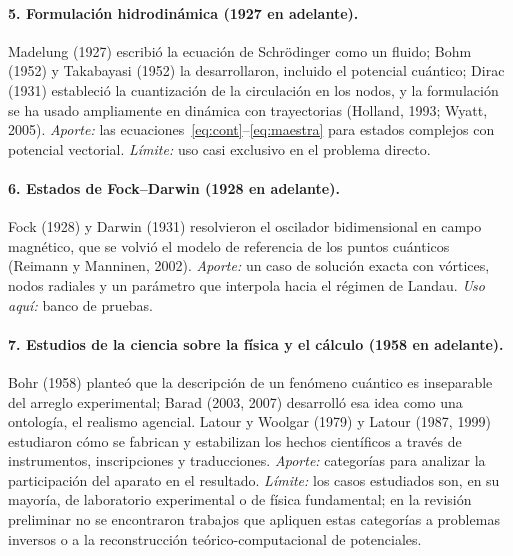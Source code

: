 \documentclass[12pt,letterpaper]{article}
\begin{document}
\paragraph{5. Formulación hidrodinámica (1927 en adelante).} Madelung (1927) escribió la ecuación de Schrödinger como un
fluido; Bohm (1952) y Takabayasi (1952) la desarrollaron, incluido el potencial cuántico; Dirac (1931) estableció la
cuantización de la circulación en los nodos, y la formulación se ha usado ampliamente en dinámica con trayectorias
(Holland, 1993; Wyatt, 2005). \emph{Aporte:} las ecuaciones~\eqref{eq:cont}--\eqref{eq:maestra} para estados complejos
con potencial vectorial. \emph{Límite:} uso casi exclusivo en el problema directo.

\paragraph{6. Estados de Fock--Darwin (1928 en adelante).} Fock (1928) y Darwin (1931) resolvieron el oscilador
bidimensional en campo magnético, que se volvió el modelo de referencia de los puntos cuánticos (Reimann y Manninen,
2002). \emph{Aporte:} un caso de solución exacta con vórtices, nodos radiales y un parámetro que interpola hacia el
régimen de Landau. \emph{Uso aquí:} banco de pruebas.

\paragraph{7. Estudios de la ciencia sobre la física y el cálculo (1958 en adelante).} Bohr (1958) planteó que la
descripción de un fenómeno cuántico es inseparable del arreglo experimental; Barad (2003, 2007) desarrolló esa idea como
una ontología, el realismo agencial. Latour y Woolgar (1979) y Latour (1987, 1999) estudiaron cómo se fabrican y
estabilizan los hechos científicos a través de instrumentos, inscripciones y traducciones. \emph{Aporte:} categorías para
analizar la participación del aparato en el resultado. \emph{Límite:} los casos estudiados son, en su mayoría, de
laboratorio experimental o de física fundamental; en la revisión preliminar no se encontraron trabajos que apliquen estas
categorías a problemas inversos o a la reconstrucción teórico-computacional de potenciales.
\end{document}
